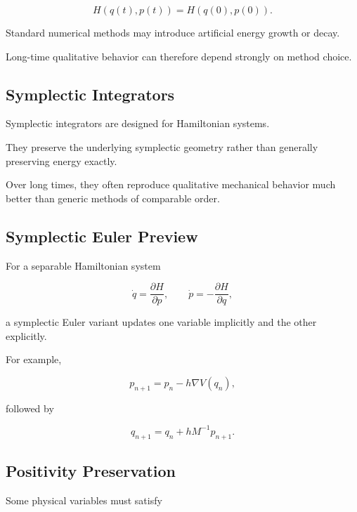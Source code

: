 \[
\boxed{
H(q(t),p(t))
=
H(q(0),p(0)).
}
\]

Standard numerical methods may introduce artificial energy growth or
decay.

Long-time qualitative behavior can therefore depend strongly on method
choice.

\subsection{Symplectic Integrators}
\label{subsec:symplectic-integrators}

Symplectic integrators are designed for Hamiltonian systems.

They preserve the underlying symplectic geometry rather than generally
preserving energy exactly.

Over long times, they often reproduce qualitative mechanical behavior much
better than generic methods of comparable order.

\subsection{Symplectic Euler Preview}
\label{subsec:symplectic-euler}

For a separable Hamiltonian system

\[
\boxed{
\dot{q}
=
\frac{\partial H}{\partial p},
\qquad
\dot{p}
=
-
\frac{\partial H}{\partial q},
}
\]

a symplectic Euler variant updates one variable implicitly and the other
explicitly.

For example,

\[
\boxed{
p_{n+1}
=
p_n
-
h
\nabla V(q_n),
}
\]

followed by

\[
\boxed{
q_{n+1}
=
q_n
+
h
M^{-1}p_{n+1}.
}
\]

\subsection{Positivity Preservation}
\label{subsec:ode-positivity-preservation}

Some physical variables must satisfy

